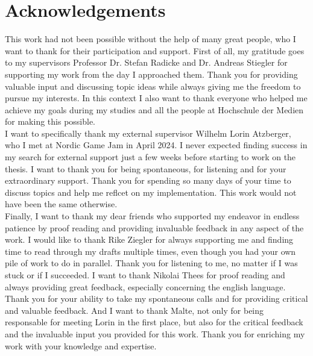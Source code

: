 \chapter{Acknowledgements}

This work had not been possible without the help of many great people, who I want to thank for their 
participation and support. First of all, my gratitude goes to my supervisors Professor Dr. Stefan Radicke 
and Dr. Andreas Stiegler for supporting my work from the day I approached them. Thank you for providing 
valuable input and discussing topic ideas while always giving me the freedom to pursue my interests. In 
this context I also want to thank everyone who helped me achieve my goals during my studies and all the 
people at Hochschule der Medien for making this possible. \\

\noindent
I want to specifically thank my external supervisor Wilhelm Lorin Atzberger, who I met at Nordic Game Jam 
in April 2024. I never expected finding success in my search for external support just a few weeks before 
starting to work on the thesis. I want to thank you for being spontaneous, for listening and for your 
extraordinary support. Thank you for spending so many days of your time to discuss topics and help me 
reflcet on my implementation. This work would not have been the same otherwise. \\

\noindent
Finally, I want to thank my dear friends who supported my endeavor in endless patience by proof reading and 
providing invaluable feedback in any aspect of the work. I would like to thank Rike Ziegler for always 
supporting me and finding time to read through my drafts multiple times, even though you had your own 
pile of work to do in parallel. Thank you for listening to me, no matter if I was stuck or if I succeeded. 
I want to thank Nikolai Thees for proof reading and always providing great feedback, especially concerning 
the english language. Thank you for your ability to take my spontaneous calls and for providing critical and 
valuable feedback. And I want to thank Malte, not only for being responsable for meeting Lorin in the 
first place, but also for the critical feedback and the invaluable input you provided for this work. Thank 
you for enriching my work with your knowledge and expertise. \\
